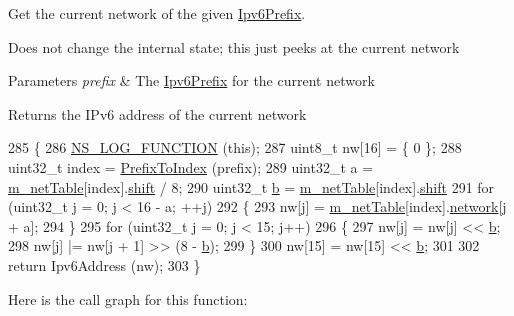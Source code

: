 Get the current network of the given \hyperlink{classns3_1_1Ipv6Prefix}{Ipv6\+Prefix}. 

Does not change the internal state; this just peeks at the current network


\begin{DoxyParams}{Parameters}
{\em prefix} & The \hyperlink{classns3_1_1Ipv6Prefix}{Ipv6\+Prefix} for the current network \\
\hline
\end{DoxyParams}
\begin{DoxyReturn}{Returns}
the I\+Pv6 address of the current network 
\end{DoxyReturn}

\begin{DoxyCode}
285 \{
286   \hyperlink{log-macros-disabled_8h_a90b90d5bad1f39cb1b64923ea94c0761}{NS\_LOG\_FUNCTION} (\textcolor{keyword}{this});
287   uint8\_t nw[16] = \{ 0 \};
288   uint32\_t index = \hyperlink{classns3_1_1Ipv6AddressGeneratorImpl_a0dbdd6e1547463c189a0e82251557e44}{PrefixToIndex} (prefix);
289   uint32\_t a = \hyperlink{classns3_1_1Ipv6AddressGeneratorImpl_a4b742848bb716936009880a429664323}{m\_netTable}[index].\hyperlink{classns3_1_1Ipv6AddressGeneratorImpl_1_1NetworkState_a959c55b3a4900a71975f7f5ea3b2d859}{shift} / 8;
290   uint32\_t \hyperlink{buildings__pathloss_8m_a21ad0bd836b90d08f4cf640b4c298e7c}{b} = \hyperlink{classns3_1_1Ipv6AddressGeneratorImpl_a4b742848bb716936009880a429664323}{m\_netTable}[index].\hyperlink{classns3_1_1Ipv6AddressGeneratorImpl_1_1NetworkState_a959c55b3a4900a71975f7f5ea3b2d859}{shift} %
291   \textcolor{keywordflow}{for} (uint32\_t j = 0; j < 16 - a; ++j)
292     \{
293       nw[j] = \hyperlink{classns3_1_1Ipv6AddressGeneratorImpl_a4b742848bb716936009880a429664323}{m\_netTable}[index].\hyperlink{classns3_1_1Ipv6AddressGeneratorImpl_1_1NetworkState_ac84710d199384c02e953fd604fe34cee}{network}[j + a];
294     \}
295   \textcolor{keywordflow}{for} (uint32\_t j = 0; j < 15; j++)
296     \{
297       nw[j] = nw[j] << \hyperlink{buildings__pathloss_8m_a21ad0bd836b90d08f4cf640b4c298e7c}{b};
298       nw[j] |= nw[j + 1] >> (8 - \hyperlink{buildings__pathloss_8m_a21ad0bd836b90d08f4cf640b4c298e7c}{b});
299     \}
300   nw[15] = nw[15] << \hyperlink{buildings__pathloss_8m_a21ad0bd836b90d08f4cf640b4c298e7c}{b};
301 
302   \textcolor{keywordflow}{return} Ipv6Address (nw);
303 \}
\end{DoxyCode}


Here is the call graph for this function\+:


